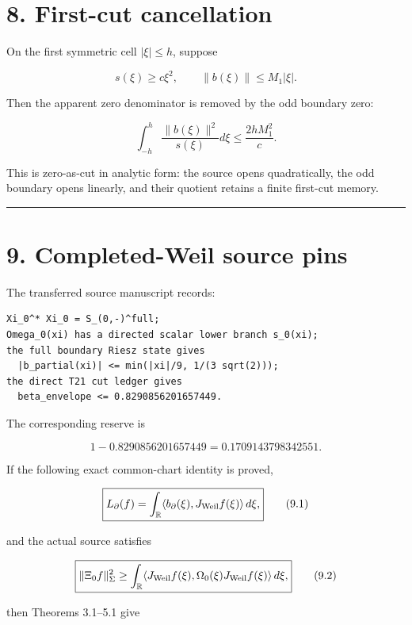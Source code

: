 \hypertarget{first-cut-cancellation}{%
\section{8. First-cut cancellation}\label{first-cut-cancellation}}

On the first symmetric cell \(|\xi|\le h\), suppose

\[
s(\xi)\ge c\xi^2,
\qquad
\|b(\xi)\|\le M_1|\xi|.
\]

Then the apparent zero denominator is removed by the odd boundary zero:

\[
\boxed{
\int_{-h}^{h}\frac{\|b(\xi)\|^2}{s(\xi)}d\xi
\le
\frac{2hM_1^2}{c}.
}
\tag{8.1}
\]

This is zero-as-cut in analytic form: the source opens quadratically, the odd
boundary opens linearly, and their quotient retains a finite first-cut memory.

\begin{center}\rule{0.5\linewidth}{0.5pt}\end{center}

\hypertarget{completed-weil-source-pins}{%
\section{9. Completed-Weil source pins}\label{completed-weil-source-pins}}

The transferred source manuscript records:

\begin{verbatim}
Xi_0^* Xi_0 = S_(0,-)^full;
Omega_0(xi) has a directed scalar lower branch s_0(xi);
the full boundary Riesz state gives
  |b_partial(xi)| <= min(|xi|/9, 1/(3 sqrt(2)));
the direct T21 cut ledger gives
  beta_envelope <= 0.8290856201657449.
\end{verbatim}

The corresponding reserve is

\[
\boxed{
1-0.8290856201657449
=0.1709143798342551.
}
\]

If the following exact common-chart identity is proved,

\[
\boxed{
L_\partial(f)
=
\int_{\mathbb R}
\langle b_\partial(\xi),J_{\rm Weil}f(\xi)\rangle\,d\xi,
}
\tag{9.1}
\]

and the actual source satisfies

\[
\boxed{
\|\Xi_0f\|_\Sigma^2
\ge
\int_{\mathbb R}
\langle J_{\rm Weil}f(\xi),
\Omega_0(\xi)J_{\rm Weil}f(\xi)\rangle\,d\xi,
}
\tag{9.2}
\]

then Theorems 3.1--5.1 give

